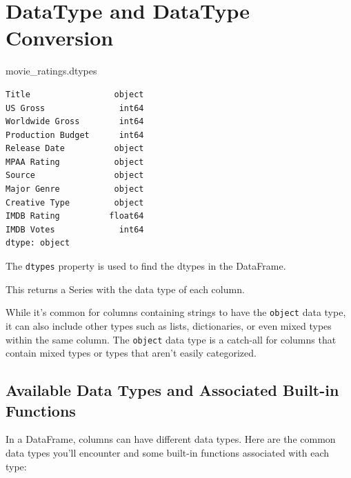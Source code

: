 \documentclass[
  letterpaper,
  DIV=11,
  numbers=noendperiod]{scrreprt}
\newenvironment{Shaded}{\begin{snugshade}}{\end{snugshade}}
\newcommand{\NormalTok}[1]{\textcolor[rgb]{0.00,0.23,0.31}{#1}}
\begin{document}
\hypertarget{datatype-and-datatype-conversion}{%
\section{DataType and DataType
Conversion}\label{datatype-and-datatype-conversion}}

\begin{Shaded}
\begin{Highlighting}[]
\NormalTok{movie\_ratings.dtypes}
\end{Highlighting}
\end{Shaded}

\begin{verbatim}
Title                 object
US Gross               int64
Worldwide Gross        int64
Production Budget      int64
Release Date          object
MPAA Rating           object
Source                object
Major Genre           object
Creative Type         object
IMDB Rating          float64
IMDB Votes             int64
dtype: object
\end{verbatim}

The \texttt{dtypes} property is used to find the dtypes in the
DataFrame.

This returns a Series with the data type of each column.

While it's common for columns containing strings to have the
\texttt{object} data type, it can also include other types such as
lists, dictionaries, or even mixed types within the same column. The
\texttt{object} data type is a catch-all for columns that contain mixed
types or types that aren't easily categorized.

\hypertarget{available-data-types-and-associated-built-in-functions}{%
\subsection{Available Data Types and Associated Built-in
Functions}\label{available-data-types-and-associated-built-in-functions}}

In a DataFrame, columns can have different data types. Here are the
common data types you'll encounter and some built-in functions
associated with each type:
\end{document}
